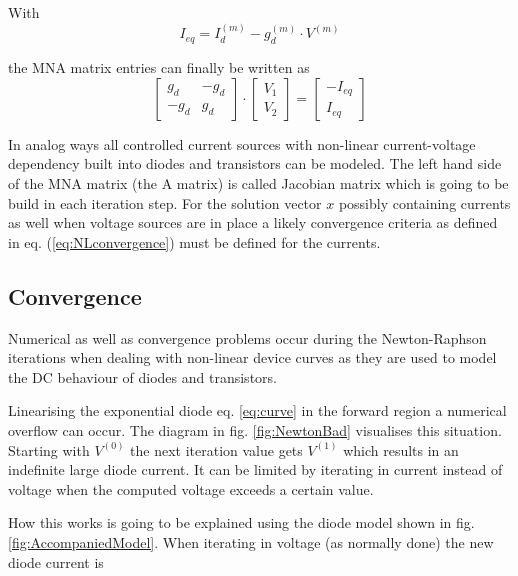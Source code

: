 \label{sec:DCdiode}

With
\begin{equation}
I_{eq} = I_{d}^{(m)} - g_{d}^{(m)}\cdot V^{(m)}
\end{equation}

the MNA matrix entries can finally be written as
\begin{equation}
\begin{bmatrix}
g_{d} & -g_{d}\\
-g_{d} & g_{d}
\end{bmatrix}
\cdot
\begin{bmatrix}
V_{1}\\
V_{2}
\end{bmatrix}
=
\begin{bmatrix}
-I_{eq}\\
I_{eq}
\end{bmatrix}
\end{equation}

In analog ways all controlled current sources with non-linear
current-voltage dependency built into diodes and transistors can be
modeled.  The left hand side of the MNA matrix (the A matrix) is
called Jacobian matrix which is going to be build in each iteration
step.  For the solution vector $x$ possibly containing currents as
well when voltage sources are in place a likely convergence criteria
as defined in eq. (\ref{eq:NLconvergence}) must be defined for the
currents.

\subsection{Convergence}

Numerical as well as convergence problems occur during the
Newton-Raphson iterations when dealing with non-linear device curves
as they are used to model the DC behaviour of diodes and transistors.

\addvspace{12pt}

Linearising the exponential diode eq. \eqref{eq:curve} in the forward
region a numerical overflow can occur.  The diagram in
fig. \ref{fig:NewtonBad} visualises this situation.  Starting with
$V^{(0)}$ the next iteration value gets $V^{(1)}$ which results in an
indefinite large diode current.  It can be limited by iterating in
current instead of voltage when the computed voltage exceeds a certain
value.

\addvspace{12pt}

How this works is going to be explained using the diode model shown in
fig. \ref{fig:AccompaniedModel}.  When iterating in voltage (as
normally done) the new diode current is

